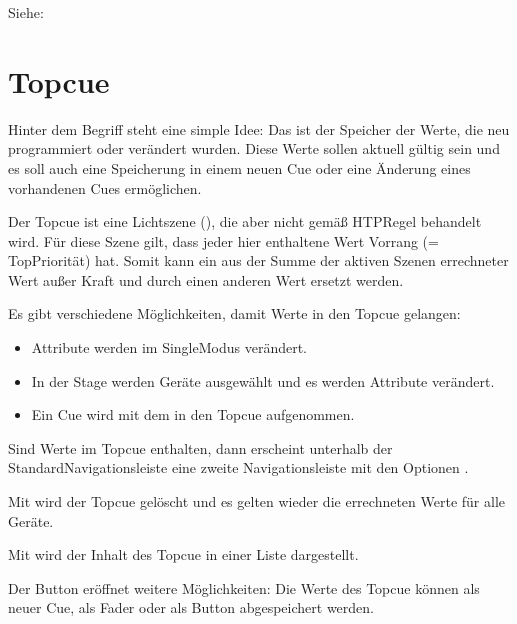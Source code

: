\documentclass[letterpaper,10pt,ngerman]{sphinxmanual}
\begin{document}
Siehe: 


\section{Topcue}
\label{\detokenize{grundlagen:topcue}}\label{\detokenize{grundlagen:topcuelabel}}
Hinter dem Begriff  steht eine simple Idee: Das ist der Speicher
der Werte, die neu programmiert oder verändert wurden. Diese Werte sollen
aktuell gültig sein und es soll auch eine Speicherung in einem neuen Cue oder
eine Änderung eines vorhandenen Cues ermöglichen.

Der Topcue ist eine Lichtszene (), die aber nicht gemäß HTP\sphinxhyphen{}Regel
behandelt wird. Für diese Szene gilt, dass jeder hier enthaltene Wert
Vorrang (= Top\sphinxhyphen{}Priorität) hat. Somit kann ein aus der Summe der aktiven
Szenen errechneter Wert außer Kraft und durch einen anderen Wert ersetzt
werden.

Es gibt verschiedene Möglichkeiten, damit Werte in den Topcue gelangen:
\begin{itemize}
\item {} 
Attribute werden im Single\sphinxhyphen{}Modus verändert.

\item {} 
In der Stage werden Geräte ausgewählt und es werden Attribute
verändert.

\item {} 
Ein Cue wird mit dem  in den Topcue aufgenommen.

\end{itemize}

\noindent{}

Sind Werte im Topcue enthalten, dann erscheint unterhalb der
Standard\sphinxhyphen{}Navigationsleiste
eine zweite Navigationsleiste mit den Optionen .

Mit  wird der Topcue gelöscht und es gelten wieder die errechneten Werte
für alle Geräte.

Mit  wird der Inhalt des Topcue in einer Liste dargestellt.

Der Button  eröffnet weitere Möglichkeiten: Die Werte des Topcue
können als neuer Cue, als Fader oder als Button abgespeichert werden.
\end{document}
